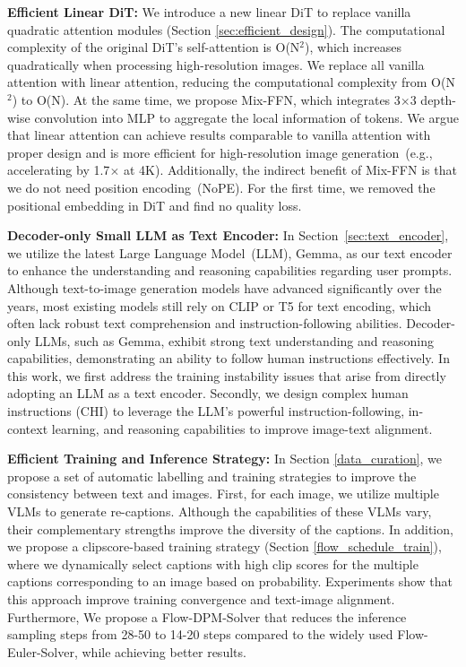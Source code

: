 \textbf{Efficient Linear DiT:} 
We introduce a new linear DiT to replace vanilla quadratic attention modules (Section \ref{sec:efficient_design}). 
The computational complexity of the original DiT's self-attention is O(N$^2$), which increases quadratically when processing high-resolution images. We replace all vanilla attention with linear attention, reducing the computational complexity from O(N$^2$) to O(N).
At the same time, we propose Mix-FFN, which integrates 3$\times$3 depth-wise convolution into MLP to aggregate the local information of tokens. We argue that linear attention can achieve results comparable to vanilla attention with proper design and is more efficient for high-resolution image generation~(e.g., accelerating by 1.7$\times$ at 4K). Additionally, the indirect benefit of Mix-FFN is that we do not need position encoding~(NoPE). For the first time, we removed the positional embedding in DiT and find no quality loss.

\textbf{Decoder-only Small LLM as Text Encoder:} 
In Section~\ref{sec:text_encoder}, we utilize the latest Large Language Model~(LLM), Gemma, as our text encoder to enhance the understanding and reasoning capabilities regarding user prompts. Although text-to-image generation models have advanced significantly over the years, most existing models still rely on CLIP or T5 for text encoding, which often lack robust text comprehension and instruction-following abilities.
Decoder-only LLMs, such as Gemma, exhibit strong text understanding and reasoning capabilities, demonstrating an ability to follow human instructions effectively. In this work, we first address the training instability issues that arise from directly adopting an LLM as a text encoder. Secondly, we design complex human instructions (CHI) to leverage the LLM's powerful instruction-following, in-context learning, and reasoning capabilities to improve image-text alignment.

\textbf{Efficient Training and Inference Strategy:}
In Section \ref{data_curation}, we propose a set of automatic labelling and training strategies to improve the consistency between text and images. First, for each image, we utilize multiple VLMs to generate re-captions. Although the capabilities of these VLMs vary, their complementary strengths improve the diversity of the captions. 
In addition, we propose a clipscore-based training strategy (Section \ref{flow_schedule_train}), where we dynamically select captions with high clip scores for the multiple captions corresponding to an image based on probability.
Experiments show that this approach improve training convergence and text-image alignment. Furthermore, We propose a Flow-DPM-Solver that reduces the inference sampling steps from 28-50 to 14-20 steps compared to the widely used Flow-Euler-Solver, while achieving better results.

